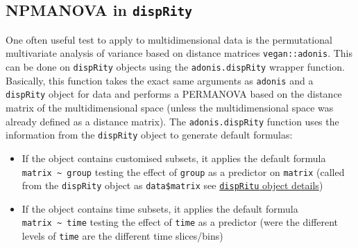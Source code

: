 \documentclass[]{book}
\providecommand{\tightlist}{%
  \setlength{\itemsep}{0pt}\setlength{\parskip}{0pt}}
\theoremstyle{definition}
\theoremstyle{definition}
\theoremstyle{definition}
\theoremstyle{remark}
\begin{document}
\subsection{\texorpdfstring{NPMANOVA in
\texttt{dispRity}}{NPMANOVA in dispRity}}\label{npmanova-in-disprity}

One often useful test to apply to multidimensional data is the
permutational multivariate analysis of variance based on distance
matrices \texttt{vegan::adonis}. This can be done on \texttt{dispRity}
objects using the \texttt{adonis.dispRity} wrapper function. Basically,
this function takes the exact same arguments as \texttt{adonis} and a
\texttt{dispRity} object for data and performs a PERMANOVA based on the
distance matrix of the multidimensional space (unless the
multidimensional space was already defined as a distance matrix). The
\texttt{adonis.dispRity} function uses the information from the
\texttt{dispRity} object to generate default formulas:

\begin{itemize}
\tightlist
\item
  If the object contains customised subsets, it applies the default
  formula \texttt{matrix\ \textasciitilde{}~group} testing the effect of
  \texttt{group} as a predictor on \texttt{matrix} (called from the
  \texttt{dispRity} object as \texttt{data\$matrix} see
  \protect\hyperlink{The-dispRity-object-content}{\texttt{dispRitu}
  object details})
\item
  If the object contains time subsets, it applies the default formula
  \texttt{matrix\ \textasciitilde{}\ time} testing the effect of
  \texttt{time} as a predictor (were the different levels of
  \texttt{time} are the different time slices/bins)
\end{itemize}
\end{document}
